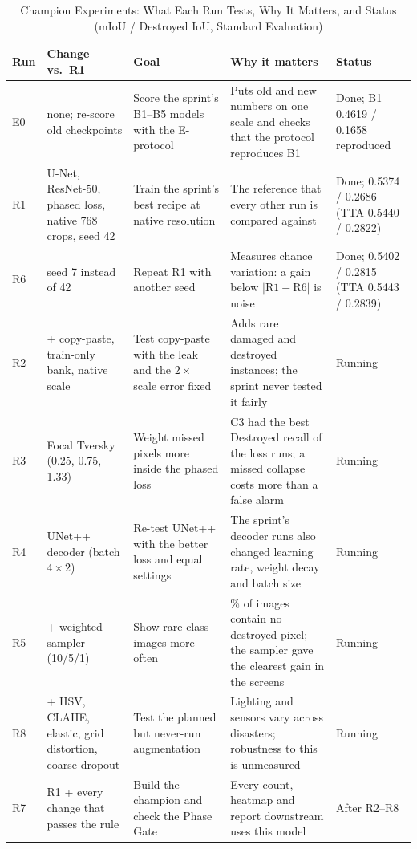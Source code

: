 \documentclass[conference]{IEEEtran}
\begin{document}
\begin{table}[t]
\caption{Champion Experiments: What Each Run Tests, Why It Matters, and Status (mIoU / Destroyed IoU, Standard Evaluation)}
\label{tab:runs}
\centering
\footnotesize
\setlength{\tabcolsep}{4pt}
\begin{tabular}{@{}l>{\raggedright\arraybackslash}p{3.2cm}>{\raggedright\arraybackslash}p{4.1cm}>{\raggedright\arraybackslash}p{5.4cm}>{\raggedright\arraybackslash}p{2.7cm}@{}}
\toprule
Run & Change vs.\ R1 & Goal & Why it matters & Status\\
\midrule
E0 & none; re-score old checkpoints & Score the sprint's B1--B5 models with the E-protocol & Puts old and new numbers on one scale and checks that the protocol reproduces B1 & Done; B1 0.4619 / 0.1658 reproduced\\
R1 & U-Net, ResNet-50, phased loss, native 768 crops, seed 42 & Train the sprint's best recipe at native resolution & The reference that every other run is compared against & Done; 0.5374 / 0.2686 (TTA 0.5440 / 0.2822)\\
R6 & seed 7 instead of 42 & Repeat R1 with another seed & Measures chance variation: a gain below $|\mathrm{R1}-\mathrm{R6}|$ is noise & Done; 0.5402 / 0.2815 (TTA 0.5443 / 0.2839)\\
R2 & + copy-paste, train-only bank, native scale & Test copy-paste with the leak and the $2\times$ scale error fixed & Adds rare damaged and destroyed instances; the sprint never tested it fairly & Running\\
R3 & Focal Tversky (0.25, 0.75, 1.33) & Weight missed pixels more inside the phased loss & C3 had the best Destroyed recall of the loss runs; a missed collapse costs more than a false alarm & Running\\
R4 & UNet++ decoder (batch $4\times2$) & Re-test UNet++ with the better loss and equal settings & The sprint's decoder runs also changed learning rate, weight decay and batch size & Running\\
R5 & + weighted sampler (10/5/1) & Show rare-class images more often & 63\% of images contain no destroyed pixel; the sampler gave the clearest gain in the screens & Running\\
R8 & + HSV, CLAHE, elastic, grid distortion, coarse dropout & Test the planned but never-run augmentation & Lighting and sensors vary across disasters; robustness to this is unmeasured & Running\\
R7 & R1 + every change that passes the rule & Build the champion and check the Phase Gate & Every count, heatmap and report downstream uses this model & After R2--R8\\
\bottomrule
\end{tabular}
\end{table}
\end{document}

